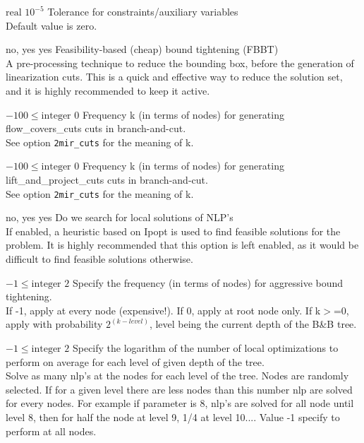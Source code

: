 %
{$\textrm{real}$}%
{$10^{- 5}$}%
{Tolerance for constraints/auxiliary variables\\
Default value is zero.}%
{}

%
{\ttfamily no, yes}%
{yes}%
{Feasibility-based (cheap) bound tightening (FBBT)\\
A pre-processing technique to reduce the bounding box, before the generation of linearization cuts. This is a quick and effective way to reduce the solution set, and it is highly recommended to keep it active.}%
{}

%
{$-100\leq\textrm{integer}$}%
{$0$}%
{Frequency k (in terms of nodes) for generating flow\_covers\_cuts cuts in branch-and-cut.\\
See option \texttt{2mir\_cuts} for the meaning of k.}%
{}

%
{$-100\leq\textrm{integer}$}%
{$0$}%
{Frequency k (in terms of nodes) for generating lift\_and\_project\_cuts cuts in branch-and-cut.\\
See option \texttt{2mir\_cuts} for the meaning of k.}%
{}

%
{\ttfamily no, yes}%
{yes}%
{Do we search for local solutions of NLP's\\
If enabled, a heuristic based on Ipopt is used to find feasible solutions for the problem. It is highly recommended that this option is left enabled, as it would be difficult to find feasible solutions otherwise.}%
{}

%
{$-1\leq\textrm{integer}$}%
{$2$}%
{Specify the frequency (in terms of nodes) for aggressive bound tightening.\\
If -1, apply at every node (expensive!). If 0, apply at root node only. If k$>$=0, apply with probability $2^{(k - level)}$, level being the current depth of the B\&B tree.}%
{}

%
{$-1\leq\textrm{integer}$}%
{$2$}%
{Specify the logarithm of the number of local optimizations to perform on average for each level of given depth of the tree.\\
Solve as many nlp's at the nodes for each level of the tree. Nodes are randomly selected. If for a given level there are less nodes than this number nlp are solved for every nodes. For example if parameter is 8, nlp's are solved for all node until level 8, then for half the node at level 9, 1/4 at level 10.... Value -1 specify to perform at all nodes.}%
{}

